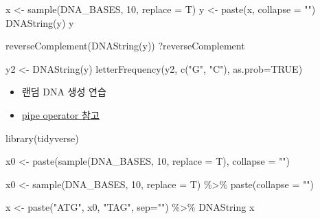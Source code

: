\documentclass[
]{book}
\newenvironment{Shaded}{\begin{snugshade}}{\end{snugshade}}
\newcommand{\AttributeTok}[1]{\textcolor[rgb]{0.77,0.63,0.00}{#1}}
\newcommand{\ConstantTok}[1]{\textcolor[rgb]{0.00,0.00,0.00}{#1}}
\newcommand{\DecValTok}[1]{\textcolor[rgb]{0.00,0.00,0.81}{#1}}
\newcommand{\FunctionTok}[1]{\textcolor[rgb]{0.00,0.00,0.00}{#1}}
\newcommand{\NormalTok}[1]{#1}
\newcommand{\OtherTok}[1]{\textcolor[rgb]{0.56,0.35,0.01}{#1}}
\newcommand{\SpecialCharTok}[1]{\textcolor[rgb]{0.00,0.00,0.00}{#1}}
\newcommand{\StringTok}[1]{\textcolor[rgb]{0.31,0.60,0.02}{#1}}
\providecommand{\tightlist}{%
  \setlength{\itemsep}{0pt}\setlength{\parskip}{0pt}}
\begin{document}
\begin{Shaded}
\begin{Highlighting}[]

\NormalTok{x }\OtherTok{\textless{}{-}} \FunctionTok{sample}\NormalTok{(DNA\_BASES, }\DecValTok{10}\NormalTok{, }\AttributeTok{replace =}\NormalTok{ T)}
\NormalTok{y }\OtherTok{\textless{}{-}} \FunctionTok{paste}\NormalTok{(x, }\AttributeTok{collapse =} \StringTok{""}\NormalTok{)}
\FunctionTok{DNAString}\NormalTok{(y)}
\NormalTok{y}

\FunctionTok{reverseComplement}\NormalTok{(}\FunctionTok{DNAString}\NormalTok{(y))}
\NormalTok{?reverseComplement}

\NormalTok{y2 }\OtherTok{\textless{}{-}} \FunctionTok{DNAString}\NormalTok{(y)}
\FunctionTok{letterFrequency}\NormalTok{(y2, }\FunctionTok{c}\NormalTok{(}\StringTok{"G"}\NormalTok{, }\StringTok{"C"}\NormalTok{), }\AttributeTok{as.prob=}\ConstantTok{TRUE}\NormalTok{)}
\end{Highlighting}
\end{Shaded}

\begin{itemize}
\tightlist
\item
  랜덤 DNA 생성 연습
\item
  \href{https://greendaygh.github.io/kribbr2022/tidyverse.html\#pipe-operator}{pipe operator 참고}
\end{itemize}

\begin{Shaded}
\begin{Highlighting}[]
\FunctionTok{library}\NormalTok{(tidyverse)}

\NormalTok{x0 }\OtherTok{\textless{}{-}} \FunctionTok{paste}\NormalTok{(}\FunctionTok{sample}\NormalTok{(DNA\_BASES, }\DecValTok{10}\NormalTok{, }\AttributeTok{replace =}\NormalTok{ T), }\AttributeTok{collapse =} \StringTok{""}\NormalTok{)}

\NormalTok{x0 }\OtherTok{\textless{}{-}} \FunctionTok{sample}\NormalTok{(DNA\_BASES, }\DecValTok{10}\NormalTok{, }\AttributeTok{replace =}\NormalTok{ T) }\SpecialCharTok{\%\textgreater{}\%}
        \FunctionTok{paste}\NormalTok{(}\AttributeTok{collapse =} \StringTok{""}\NormalTok{)}

\NormalTok{x }\OtherTok{\textless{}{-}} \FunctionTok{paste}\NormalTok{(}\StringTok{"ATG"}\NormalTok{, x0, }\StringTok{"TAG"}\NormalTok{, }\AttributeTok{sep=}\StringTok{""}\NormalTok{) }\SpecialCharTok{\%\textgreater{}\%} 
\NormalTok{      DNAString}
\NormalTok{x}
\end{Highlighting}
\end{Shaded}
\end{document}
